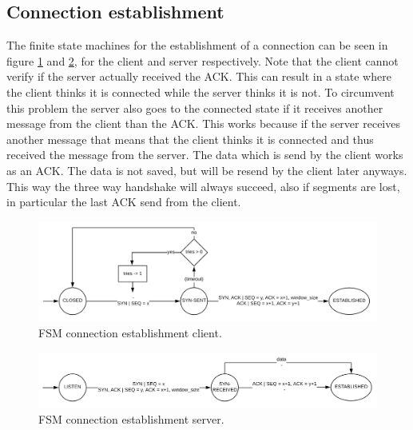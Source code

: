 \documentclass[a4paper]{article}
\begin{document}
	\subsection{Connection establishment}
	The finite state machines for the establishment of a connection can be seen in figure \ref{fig: phase 1 client} and \ref{fig: phase 1 server}, for the client and server respectively. Note that the client cannot verify if the server actually received the ACK. This can result in a state where the client thinks it is connected while the server thinks it is not. To circumvent this problem the server also goes to the connected state if it receives another message from the client than the ACK. This works because if the server receives another message that means that the client thinks it is connected and thus received the message from the server. The data which is send by the client works as an ACK. The data is not saved, but will be resend by the client later anyways. This way the three way handshake will always succeed, also if segments are lost, in particular the last ACK send from the client.
	\begin{figure}[h]
		\centering
		\includegraphics[width = \textwidth]{phase1_client.png}
		\caption{FSM connection establishment client.}
		\label{fig: phase 1 client}
	\end{figure}
	\begin{figure}[h]
		\centering
		\includegraphics[width = \textwidth]{phase1_server.png}
		\caption{FSM connection establishment server.}
		\label{fig: phase 1 server}
	\end{figure}
\end{document}
